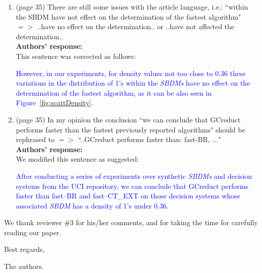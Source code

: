 \documentclass{letter}
\newtheorem{definition}{Definition}
\begin{document}
\begin{letter}{}
\begin{enumerate}
	\begin{definition}\label{def:basic_row}
		\textcolor{blue}{Let $DM$ be a binary discernibility matrix and $r_k \in DM$ be a row of $DM$. We say that $r_k$ is a superfluous row of $DM$ if $\exists r \in DM$ such that $\exists i | (r[i] < r_k[i]) \wedge \forall i | (r[i] \leq r_k[i])$, where $r[i]$ is the $i$-th element of the row $r$.}	
	\end{definition}	 
	
	\item (page 35) There are still some issues with the article language, i.e.: ``within the SBDM have not effect on the determination of the fastest algorithm" $=>$ ..have no effect on the determination.. or ..have not affected the determination..\\
	\textbf{Authors’ response:}\\
	This sentence was corrected as follows:
	
	\textcolor{blue}{However, in our experiments, for density values not too close to 0.36 these variations in the distribution of 1's within the \textit{SBDMs} have no effect on the determination of the fastest algorithm, as it can be also seen in Figure~\ref{fig:scattDensity}.}
	
	\item (page 35) In my opinion the conclusion ``we can conclude that GCreduct performs faster than the fastest previously reported algorithms" should be rephrased to $=>$  ``..GCreduct performs faster than: fast-BR, ..."\\
	\textbf{Authors’ response:}\\
	We modified this sentence as suggested:
	
	\textcolor{blue}{After conducting a series of experiments over synthetic \textit{SBDMs} and decision systems from the UCI repository, we can conclude that GCreduct performs faster than fast--BR and fast--CT\_EXT on those decision systems whose associated \textit{SBDM} has a density of 1's under 0.36.}
	
  \end{enumerate}    
   
  We thank reviewer \#3 for his/her comments, and for taking the time for carefully reading our paper.
  
  Best regards,

  The authors.
  
\end{letter}
\end{document}
